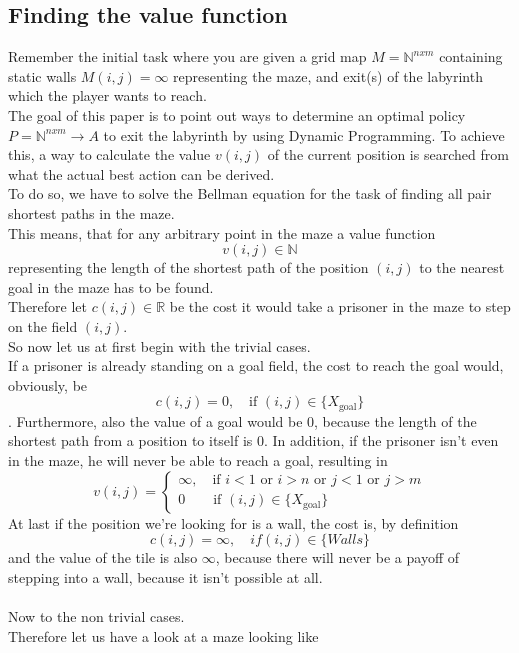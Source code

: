 \documentclass[conference]{IEEEtran}
\begin{document}
\subsection{Finding the value function}
Remember the initial task where you are given a grid map $M=\mathbb{N}^{nxm}$ containing static walls $M(i,j)=\infty$ representing the maze, and exit(s) of the labyrinth which the player wants to reach.\\
The goal of this paper is to point out ways to determine an optimal policy $P=\mathbb{N}^{nxm}\rightarrow A$ to exit the labyrinth by using Dynamic Programming. To achieve this, a way to calculate the value $v(i,j)$ of the current position is searched from what the actual best action can be derived.\\
To do so, we have to solve the Bellman equation for the task of finding all pair shortest paths in the maze.\\
This means, that for any arbitrary point in the maze a value function
\begin{equation}
v(i,j)\in \mathbb{N}
\end{equation}
representing the length of the shortest path of the position $(i, j)$ to the nearest goal in the maze has to be found.\\
Therefore let $c(i,j) \in \mathbb{R}$ be the cost it would take a prisoner in the maze to step on the field $(i,j)$.\\

So now let us at first begin with the trivial cases.\\
If a prisoner is already standing on a goal field, the cost to reach the goal would, obviously, be 
\begin{equation}
c(i,j) = 0, \quad \text{if } (i,j) \in \{X_\text{goal}\}
\end{equation}. 
Furthermore, also the value of a goal would be $0$, because the length of the shortest path from a position to itself is $0$.
In addition, if the prisoner isn't even in the maze, he will never be able to reach a goal, resulting in
\begin{equation}
v(i,j) = 
  \begin{cases}	
	\infty, \quad \text{if } i < 1 \text{ or } i > n \text{ or } j < 1 \text{ or } j > m \\
	0 \quad \quad \text{if } (i,j) \in \{X_\text{goal}\}
  \end{cases}
\end{equation}
At last if the position we're looking for is a wall, the cost is, by definition
\begin{equation}
c(i,j) = \infty, \quad if (i,j) \in \{Walls\}
\end{equation}
and the value of the tile is also $\infty$, because there will never be a payoff of stepping into a wall, because it isn't possible at all.
\\\\
Now to the non trivial cases.\\
Therefore let us have a look at a maze looking like
\end{document}
